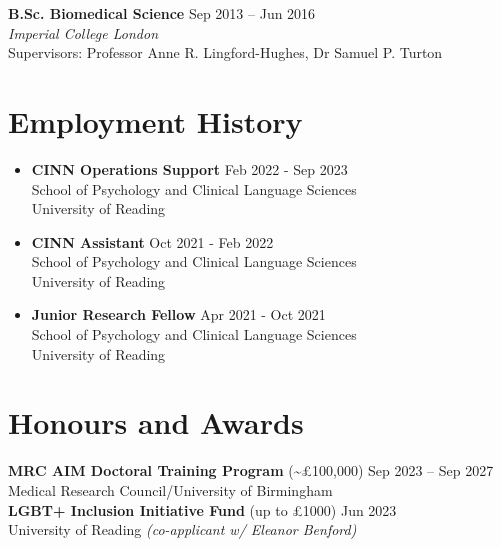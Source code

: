 \documentclass[a4paper,10pt]{article}
\makeatletter
\newcommand{\resumeItem}[1]{
  \item\small{
    {#1 \vspace{-2pt}}
  }
}
\newcommand{\resumeSubheading}[4]{
  \vspace{-0pt}\item
  \begin{minipage}{\textwidth}
    \textbf{#1} \hfill #2 \\
    #3 \\
    #4
  \end{minipage}\vspace{-7pt}
}
\newcommand{\resumeSubSubheading}[2]{
    \item
    \begin{tabular*}{0.97\textwidth}{l@{\extracolsep{\fill}}r}
      \textit{\small#1} & \textit{\small #2} \\
    \end{tabular*}\vspace{-7pt}
}
\newcommand{\resumeSubHeadingListStart}{\begin{itemize}[left=-0.06in, label={}, itemsep=-5pt]}
\newcommand{\resumeSubHeadingListEnd}{\end{itemize}}
\newcommand{\resumeItemListStart}{\begin{itemize}}
\newcommand{\resumeItemListEnd}{\end{itemize}\vspace{-5pt}}
\makeatother
\begin{document}
\begin{adjustwidth}{0em}{0pt}
\textbf{B.Sc. Biomedical Science} \hfill{Sep 2013 -- Jun 2016} \\
\emph{Imperial College London} \\
Supervisors: Professor Anne R. Lingford-Hughes, Dr Samuel P. Turton
\end{adjustwidth}



\section{Employment History}
\vspace{2pt}
  \resumeSubHeadingListStart
\resumeSubheading
  {CINN Operations Support}{Feb 2022 - Sep 2023}{School of Psychology and Clinical Language Sciences}{University of Reading}
\vspace{8pt} 
\resumeSubheading
  {CINN Assistant}{Oct 2021 - Feb 2022}{School of Psychology and Clinical Language Sciences}{University of Reading}
\vspace{8pt} 
\resumeSubheading
  {Junior Research Fellow}{Apr 2021 - Oct 2021}{School of Psychology and Clinical Language Sciences}{University of Reading}
\vspace{4pt} 
  \resumeSubHeadingListEnd
  
\section{Honours and Awards}
\vspace{2pt}
\textbf{MRC AIM Doctoral Training Program} (\textasciitilde £100,000) \hfill Sep 2023 -- Sep 2027 \\
Medical Research Council/University of Birmingham \\
\vspace{8pt} 
\textbf{LGBT+ Inclusion Initiative Fund} (up to £1000) \hfill Jun 2023\\
University of Reading \textit{(co-applicant w/ Eleanor Benford)}
\end{document}
